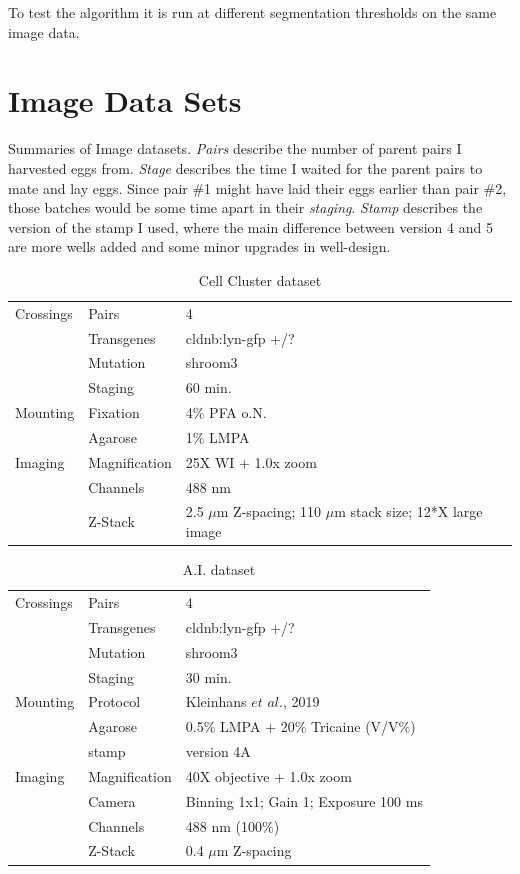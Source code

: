 \documentclass[10pt, b5paper, singlespacinge, twoside]{reedthesis} %
\theoremstyle{definition}
\theoremstyle{definition}
\theoremstyle{definition}
\theoremstyle{remark}
\begin{document}
To test the algorithm it is run at different segmentation thresholds on the same image data.

\hypertarget{mat-datasets}{%
\section{Image Data Sets}\label{mat-datasets}}

Summaries of Image datasets. \emph{Pairs} describe the number of parent pairs I harvested eggs from. \emph{Stage} describes the time I waited for the parent pairs to mate and lay eggs. Since pair \#1 might have laid their eggs earlier than pair \#2, those batches would be some time apart in their \emph{staging}. \emph{Stamp} describes the version of the stamp I used, where the main difference between version 4 and 5 are more wells added and some minor upgrades in well-design.
\begin{table}[!h]

\caption{\label{tab:imgdatcc}Cell Cluster dataset}
\centering
\begin{tabu} to 
\toprule
Crossings & Pairs & 4\\
 & Transgenes & cldnb:lyn-gfp +/?\\
 & Mutation & shroom3\\
 & Staging & 60 min.\\
Mounting & Fixation & 4$\%$ PFA o.N.\\
\addlinespace
 & Agarose & 1$\%$ LMPA\\
Imaging & Magnification & 25X WI + 1.0x zoom\\
 & Channels & 488 nm\\
 & Z-Stack & 2.5 $\mu$m Z-spacing; 110 $\mu$m stack size; 12*X large image\\
\bottomrule
\end{tabu}
\end{table}
\begin{table}[!h]

\caption{\label{tab:imgdatai}A.I. dataset}
\centering
\begin{tabu} to 
\toprule
Crossings & Pairs & 4\\
 & Transgenes & cldnb:lyn-gfp +/?\\
 & Mutation & shroom3\\
 & Staging & 30 min.\\
Mounting & Protocol & Kleinhans $\textit{et al.}$, 2019\\
\addlinespace
 & Agarose & 0.5$\%$ LMPA + 20$\%$ Tricaine (V/V$\%$)\\
 & stamp & version 4A\\
Imaging & Magnification & 40X objective + 1.0x zoom\\
 & Camera & Binning 1x1; Gain 1; Exposure 100 ms\\
 & Channels & 488 nm (100$\%$)\\
\addlinespace
 & Z-Stack & 0.4 $\mu$m Z-spacing\\
\bottomrule
\end{tabu}
\end{table}
\end{document}
